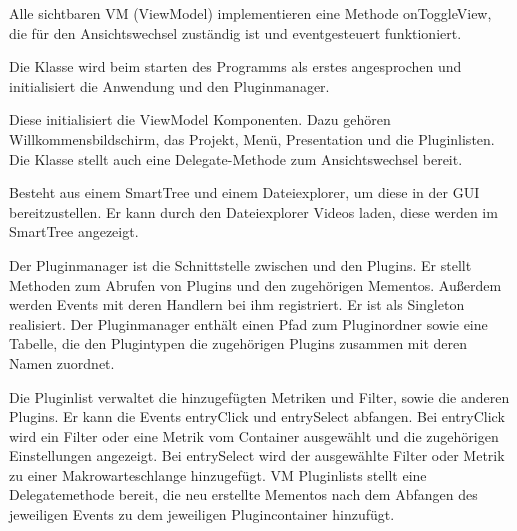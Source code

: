 Alle sichtbaren VM (ViewModel) implementieren eine Methode onToggleView, die für den Ansichtswechsel zuständig ist und eventgesteuert funktioniert.

Die Klasse wird beim starten des Programms als erstes angesprochen und initialisiert die Anwendung und den Pluginmanager.


Diese initialisiert die ViewModel Komponenten. Dazu gehören Willkommensbildschirm, das Projekt, Menü, Presentation und die Pluginlisten. Die Klasse stellt auch eine Delegate-Methode zum Ansichtswechsel bereit.


Besteht aus einem SmartTree und einem Dateiexplorer, um diese in der GUI bereitzustellen. Er kann durch den Dateiexplorer Videos laden, diese werden im SmartTree angezeigt.


Der Pluginmanager ist die Schnittstelle zwischen \projektTitel und den Plugins. Er stellt Methoden zum Abrufen von Plugins und den zugehörigen Mementos. Außerdem werden Events mit deren Handlern bei ihm registriert.  Er ist als Singleton realisiert. Der Pluginmanager enthält einen Pfad zum Pluginordner sowie eine Tabelle, die den Plugintypen die zugehörigen Plugins zusammen mit deren Namen zuordnet.


Die Pluginlist verwaltet die hinzugefügten Metriken und Filter, sowie die anderen Plugins. Er kann die Events entryClick und entrySelect abfangen. Bei entryClick wird ein Filter oder eine Metrik vom Container ausgewählt und die zugehörigen Einstellungen angezeigt. Bei entrySelect wird der ausgewählte Filter oder Metrik zu einer Makrowarteschlange hinzugefügt. VM Pluginlists stellt eine Delegatemethode bereit, die neu erstellte Mementos nach dem Abfangen des jeweiligen Events zu dem jeweiligen Plugincontainer hinzufügt.


